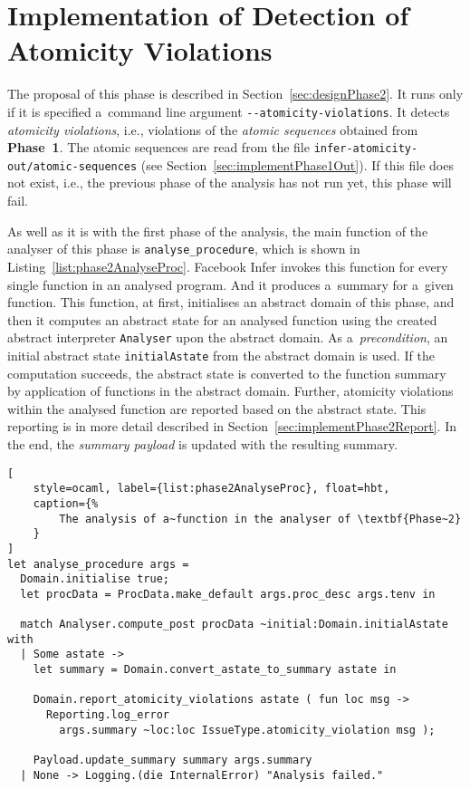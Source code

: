 \section{Implementation of Detection of Atomicity Violations}
\label{sec:implementPhase2}

The proposal of this phase is described in Section~\ref{sec:designPhase2}.
It runs only if it is specified a~command line argument
\texttt{{-}{-}atomicity-violations}. It detects \emph{atomicity violations},
i.e., violations of the \emph{atomic sequences} obtained from \textbf{Phase~1}.
The atomic sequences are read from the file
\texttt{infer-atomicity-out/atomic-sequences} (see
Section~\ref{sec:implementPhase1Out}). If this file does not exist,
i.e., the previous phase of the analysis has not run yet, this phase will
fail.

As well as it is with the first phase of the analysis, the main function
of the analyser of this phase is \texttt{analyse\_procedure}, which is shown
in Listing~\ref{list:phase2AnalyseProc}. Facebook Infer invokes this
function for every single function in an analysed program. And it produces
a~summary for a~given function. This function, at first, initialises an
abstract domain of this phase, and then it computes an abstract state
for an analysed function using the created abstract interpreter
\texttt{Analyser} upon the abstract domain. As a~\emph{precondition},
an initial abstract state \texttt{initialAstate} from the abstract domain
is used. If the computation succeeds, the abstract state is converted
to the function summary by application of functions in the abstract
domain. Further, atomicity violations within the analysed function
are reported based on the abstract state. This reporting is in more
detail described in Section~\ref{sec:implementPhase2Report}. In the end,
the \emph{summary payload} is updated with the resulting summary.

\begin{lstlisting}[
    style=ocaml, label={list:phase2AnalyseProc}, float=hbt,
    caption={%
        The analysis of a~function in the analyser of \textbf{Phase~2}
    }
]
let analyse_procedure args =
  Domain.initialise true;
  let procData = ProcData.make_default args.proc_desc args.tenv in

  match Analyser.compute_post procData ~initial:Domain.initialAstate with
  | Some astate ->
    let summary = Domain.convert_astate_to_summary astate in

    Domain.report_atomicity_violations astate ( fun loc msg ->
      Reporting.log_error
        args.summary ~loc:loc IssueType.atomicity_violation msg );

    Payload.update_summary summary args.summary
  | None -> Logging.(die InternalError) "Analysis failed."
\end{lstlisting}

